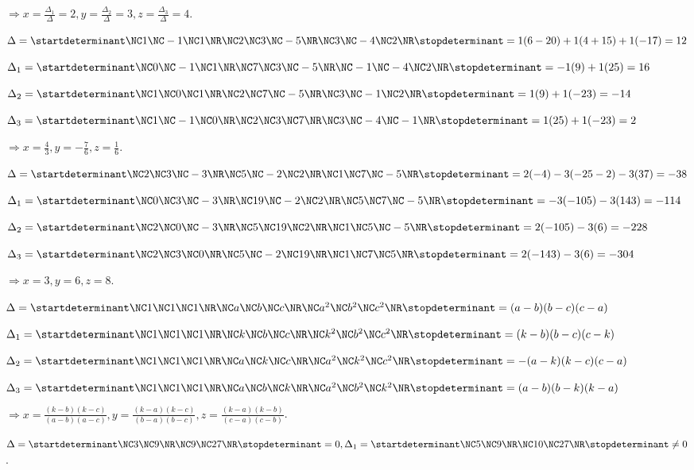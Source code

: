   $\Rightarrow x = \frac{\Delta_1}{\Delta} = 2, y = \frac{\Delta_2}{\Delta} = 3, z = \frac{\Delta_3}{\Delta}
  = 4$.
\item $\Delta = \startdeterminant\NC 1\NC -1\NC 1\NR\NC 2\NC 3\NC -5\NR\NC 3\NC -4\NC 2\NR\stopdeterminant =
  1(6 - 20) +1(4 + 15) + 1(-17) = 12$

  $\Delta_1 = \startdeterminant\NC 0\NC -1\NC 1\NR\NC 7\NC 3\NC -5\NR\NC -1\NC -4\NC 2\NR\stopdeterminant =
  -1(9) + 1(25) = 16$

  $\Delta_2 = \startdeterminant\NC 1\NC 0\NC 1\NR\NC 2\NC 7\NC -5\NR\NC 3\NC -1\NC 2\NR\stopdeterminant =
  1(9) + 1(-23) = -14$

  $\Delta_3 = \startdeterminant\NC 1\NC -1\NC 0\NR\NC 2\NC 3\NC 7\NR\NC 3\NC -4\NC -1\NR\stopdeterminant =
  1(25) + 1(-23) = 2$

  $\Rightarrow x = \frac{4}{3}, y = -\frac{7}{6}, z = \frac{1}{6}$.
\item $\Delta = \startdeterminant\NC 2\NC 3\NC -3\NR\NC 5\NC -2\NC 2\NR\NC 1\NC 7\NC -5\NR\stopdeterminant =
  2(-4) -3(-25 - 2) -3(37) = -38$

  $\Delta_1 = \startdeterminant\NC 0\NC 3\NC -3\NR\NC 19\NC -2\NC 2\NR\NC 5\NC 7\NC -5\NR\stopdeterminant =
  -3(-105) -3(143) = -114$

  $\Delta_2 = \startdeterminant\NC 2\NC 0\NC -3\NR\NC 5\NC 19\NC 2\NR\NC 1\NC 5\NC -5\NR\stopdeterminant =
  2(-105) - 3(6) = -228$

  $\Delta_3 = \startdeterminant\NC 2\NC 3\NC 0\NR\NC 5\NC -2\NC 19\NR\NC 1\NC 7\NC 5\NR\stopdeterminant =
  2(-143) - 3(6) = -304$

  $\Rightarrow x = 3, y = 6, z = 8$.
\item $\Delta = \startdeterminant\NC 1\NC 1\NC 1\NR\NC a\NC b\NC c\NR\NC a^2\NC b^2\NC
  c^2\NR\stopdeterminant = (a - b)(b - c)(c - a)$

  $\Delta_1 = \startdeterminant\NC 1\NC 1\NC 1\NR\NC k\NC b\NC c\NR\NC k^2\NC b^2\NC
  c^2\NR\stopdeterminant = (k - b)(b - c)(c - k)$

  $\Delta_2 = \startdeterminant\NC 1\NC 1\NC 1\NR\NC a\NC k\NC c\NR\NC a^2\NC k^2\NC
  c^2\NR\stopdeterminant = -(a - k)(k - c)(c - a)$

  $\Delta_3 = \startdeterminant\NC 1\NC 1\NC 1\NR\NC a\NC b\NC k\NR\NC a^2\NC b^2\NC
  k^2\NR\stopdeterminant = (a - b)(b - k)(k - a)$

  $\Rightarrow x = \frac{(k - b)(k - c)}{(a - b)(a - c)},  y = \frac{(k - a)(k - c)}{(b - a)(b - c)}, z =
  \frac{(k - a)(k - b)}{(c - a)(c - b)}$.
\item $\Delta = \startdeterminant\NC 3\NC 9\NR\NC 9\NC 27\NR\stopdeterminant = 0, \Delta_1
  = \startdeterminant\NC 5\NC 9\NR\NC 10\NC 27\NR\stopdeterminant \neq 0$.

